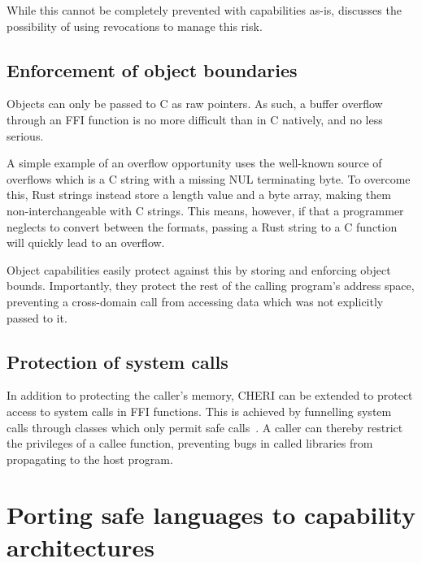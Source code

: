 \documentclass[dissertation.tex]{subfiles}
\begin{document}
While this cannot be completely prevented with capabilities as-is,
 discusses the possibility of using
revocations to manage this risk.

\subsection{Enforcement of object boundaries}

Objects can only be passed to C as raw pointers.
As such, a buffer overflow through an FFI function is no more difficult
than in C natively, and no less serious.

A simple example of an overflow opportunity uses the well-known source
of overflows which is a C string with a missing NUL terminating byte.
To overcome this, Rust strings instead store a length value and a byte
array, making them non-interchangeable with C strings.
This means, however, if that a programmer neglects to convert between
the formats, passing a Rust string to a C function will quickly lead to
an overflow.

Object capabilities easily protect against this by storing and enforcing
object bounds.
Importantly, they protect the rest of the calling program's address
space, preventing a cross-domain call from accessing data which was not
explicitly passed to it.

\subsection{Protection of system calls}
In addition to protecting the caller's memory, CHERI can be extended to
protect access to system calls in FFI functions.
This is achieved by funnelling system calls through classes which only
permit safe calls~\cite{cheri2015}.
A caller can thereby restrict the privileges of a callee function,
preventing bugs in called libraries from propagating to the host
program.


\section{Porting safe languages to capability architectures}
\label{sec:eval-othersafe}
\end{document}
